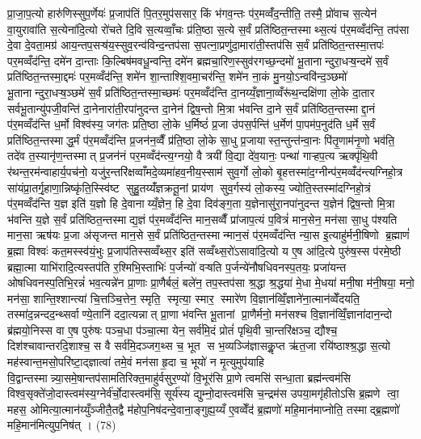 प्रा॒जा॒प॒त्यो हारु॑णिस्सुप॒र्णेयः॑ प्र॒जाप॑तिं पि॒तर॒मुप॑ससार॒ किं भ॑गव॒न्तः प॑र॒मव्वँ॑द॒न्तीति॒ तस्मै॒ प्रो॑वाच स॒त्येन॑ वा॒युरावा॑ति स॒त्येना॑दि॒त्यो रो॑चते दि॒वि स॒त्यव्वाँ॒चः प्र॑ति॒ष्ठा स॒त्ये स॒र्वं प्रति॑ष्ठित॒न्तस्माथ्स॒त्यं प॑र॒मव्वँद॑न्ति॒ तप॑सा दे॒वा दे॒वता॒मग्र॑ आय॒न्तप॒सऱ्ष॑य॒स्सुव॒रन्व॑विन्द॒न्तप॑सा स॒पत्ना॒प्रणु॑दा॒मारा॑ती॒स्तप॑सि स॒र्वं प्रति॑ष्ठित॒न्तस्मा॒त्तपः॑ पर॒मव्वँद॑न्ति॒ दमे॑न दा॒न्ताः कि॒ल्बिष॑मवधू॒न्वन्ति॒ दमे॑न ब्रह्मचा॒रिण॒स्सुव॑रगच्छ॒न्दमो॑ भू॒तानान्दुरा॒धऱ्ष॒न्दमे॑ स॒र्वं प्रति॑ष्ठित॒न्तस्मा॒द्दमः॑ पर॒मव्वँद॑न्ति॒ शमे॑न शा॒न्ताश्शि॒वमा॒चर॑न्ति॒ शमे॑न ना॒कं मु॒नयो॒ऽन्ववि॑न्द॒ञ्छमो॑ भू॒तानान्दुरा॒धऱ्ष॒ञ्छमे॑ स॒र्वं प्रति॑ष्ठित॒न्तस्मा॒च्छमः॑ पर॒मव्वँद॑न्ति दा॒नय्यँ॒ज्ञाना॒व्वँरू॑थ॒न्दक्षि॑णा लो॒के दा॒तार॑ सर्वभू॒तान्यु॑पजी॒वन्ति॑ दा॒नेनारा॑ती॒रपा॑नुदन्त दा॒नेन॑ द्विष॒न्तो मि॒त्रा भ॑वन्ति दा॒ने स॒र्वं प्रति॑ष्ठित॒न्तस्माद्दा॒नं प॑र॒मव्वँद॑न्ति ध॒र्मो विश्व॑स्य॒ जग॑तः प्रति॒ष्ठा लो॒के ध॒र्मिष्ठं॑ प्र॒जा उ॑पस॒र्पन्ति॑ ध॒र्मेण॑ पा॒पम॑प॒नुद॑ति ध॒र्मे स॒र्वं प्रति॑ष्ठित॒न्तस्माद्ध॒र्मं प॑र॒मव्वँद॑न्ति प्र॒जन॑न॒व्वैँ प्र॑ति॒ष्ठा लो॒के सा॒धु प्र॒जायास्त॒न्तुन्त॑न्वा॒नः पि॑तृ॒णाम॑नृ॒णो भव॑ति॒ तदे॑व त॒स्यानृ॑ण॒न्तस्मात् प्र॒जन॑नं पर॒मव्वँद॑न्त्य॒ग्नयो॒ वै त्रयी॑ वि॒द्या दे॑व॒यानः॒ पन्था॑ गाऱ्हप॒त्य ऋक्पृ॑थि॒वी र॑थन्त॒रम॑न्वाहार्य॒पच॑नो॒ यजु॑र॒न्तरि॑क्षव्वाँमदे॒व्यमा॑हव॒नीय॒स्साम॑ सुव॒र्गो लो॒को बृ॒हत्तस्मा॑द॒ग्नीन्प॑र॒मव्वँद॑न्त्यग्निहो॒त्र सा॑यंप्रा॒तर्गृ॒हाणा॒न्निष्कृ॑ति॒स्स्वि॑ष्ट सुहु॒तय्यँ॑ज्ञक्रतू॒नां प्राय॑ण सुव॒र्गस्य॑ लो॒कस्य॒ ज्योति॒स्तस्मा॑दग्निहो॒त्रं प॑र॒मव्वँद॑न्ति य॒ज्ञ इति॑ य॒ज्ञो हि दे॒वानाय्यँ॒ज्ञेन॒ हि दे॒वा दिव॑ङ्ग॒ता य॒ज्ञेनासु॑रा॒नपा॑नुदन्त य॒ज्ञेन॑ द्विष॒न्तो मि॒त्रा भ॑वन्ति य॒ज्ञे स॒र्वं प्रति॑ष्ठित॒न्तस्माद्य॒ज्ञं प॑र॒मव्वँद॑न्ति मान॒सव्वैँ प्रा॑जाप॒त्यं प॒वित्रं॑ मान॒सेन॒ मन॑सा सा॒धु प॑श्यति मान॒सा ऋष॑यः प्र॒जा अ॑सृजन्त मान॒से स॒र्वं प्रति॑ष्ठित॒न्तस्मान्मान॒सं प॑र॒मव्वँद॑न्ति न्या॒स इ॒त्याहु॑र्मनी॒षिणो ब्र॒ह्माणं॑ ब्र॒ह्मा विश्वः॑ कत॒मस्स्व॑यं॒भुः प्र॒जाप॑तिस्सव्वँथ्स॒र इति॑ सव्वँथ्स॒रो॑ऽसावा॑दि॒त्यो य ए॒ष आ॑दि॒त्ये पुरु॑ष॒स्स प॑रमे॒ष्ठी ब्रह्मा॒त्मा याभि॑रादि॒त्यस्तप॑ति र॒श्मिभि॒स्ताभिः॑ प॒र्जन्यो॑ वऱ्षति प॒र्जन्ये॑नौषधिवनस्प॒तयः॒ प्रजा॑यन्त ओषधिवनस्प॒तिभि॒रन्नं॑ भव॒त्यन्ने॑न प्रा॒णाः प्रा॒णैर्बलं॒ बले॑न॒ तप॒स्तप॑सा श्र॒द्धा श्र॒द्धया॑ मे॒धा मे॒धया॑ मनी॒षा म॑नी॒षया॒ मनो॒ मन॑सा॒ शान्ति॒श्शान्त्या॑ चि॒त्तञ्चि॒त्तेन॒ स्मृति॒॒ स्मृत्या॒ स्मार॒॒ स्मारे॑ण वि॒ज्ञान॑व्विँ॒ज्ञाने॑ना॒त्मान॑व्वेँदयति॒ तस्मा॑द॒न्नन्दद॒न्थ्सर्वाण्ये॒तानि॑ ददा॒त्यन्नात् प्रा॒णा भ॑वन्ति भू॒तानां प्रा॒णैर्मनो॒ मन॑सश्च वि॒ज्ञान॑व्विँ॒ज्ञाना॑दान॒न्दो ब्र॑ह्मयो॒निस्स वा ए॒ष पुरु॑षः पञ्च॒धा प॑ञ्चा॒त्मा येन॒ सर्व॑मि॒दं प्रोतं॑ पृथि॒वी चा॒न्तरि॑क्षञ्च॒ द्यौश्च॒ दिश॑श्चावान्तरदि॒शाश्च॒ स वै सर्व॑मि॒दञ्जग॒थ्स च॒ भूत॑ स भ॒व्यञ्जि॑ज्ञासकॢ॒प्त ऋ॑त॒जा रयि॑ष्ठाश्श्र॒द्धा स॒त्यो मह॑स्वान्त॒मसो॒परि॑ष्टा॒द्ज्ञात्वा॑ तमे॒वं मन॑सा हृ॒दा च॒ भूयो॑ न मृ॒त्युमुप॑याहि वि॒द्वान्तस्मान्न्या॒समे॒षान्तप॑सामतिरिक्त॒माहु॑र्वसुर॒ण्यो॑ वि॒भूर॑सि प्रा॒णे त्वमसि॑ सन्धा॒ता ब्रह्म॑न्त्वम॑सि विश्व॒सृक्ते॑जो॒दास्त्वम॑स्य॒ग्नेर्व॑र्चो॒दास्त्वम॑सि॒ सूर्य॑स्य द्युम्नो॒दास्त्वम॑सि च॒न्द्रम॑स उपया॒मगृ॑हीतोऽसि ब्र॒ह्मणे त्वा॒ महस॒ ओमित्या॒त्मान॑य्युँञ्जीतै॒तद्वै म॑होप॒निष॑दन्दे॒वाना॒ङ्गुह्य॒य्यँ ए॒वव्वेँद॑ ब्र॒ह्मणो॑ महि॒मान॑माप्नोति॒ तस्माद्ब्र॒ह्मणो॑ महि॒मान॑मित्युप॒निष॑त् । (78)
